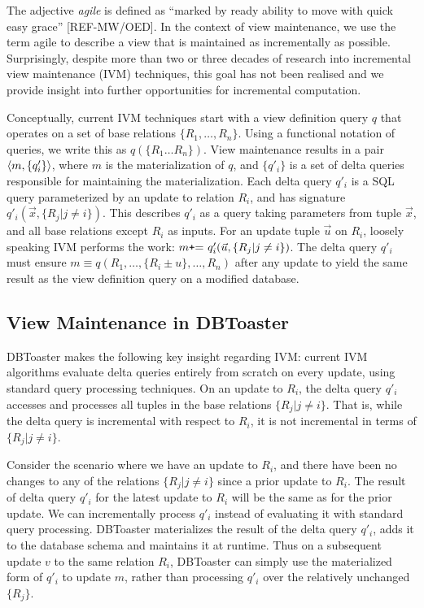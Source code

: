 \label{sec:compilation}

The adjective \textit{agile} is defined as ``marked by ready ability to move
with quick easy grace'' [REF-MW/OED]. In the context of view maintenance, we use
the term agile to describe a view that is maintained as incrementally as
possible. Surprisingly, despite more than two or three decades of research into
incremental view maintenance (IVM) techniques, this goal has not been realised
and we provide insight into further opportunities for incremental computation.

Conceptually, current IVM techniques
\cite{roussopoulos-tods:91,griffin-sigmod:95,zhou-icde:07,zhou-vldb:07} start
with a view definition query $q$ that operates on a set of base relations
$\{R_1, \ldots, R_n\}$. Using a functional notation of queries, we
write this as $q(\{R_1 \ldots R_n\})$. View maintenance results in a pair
${\langle m,\{q'_i\}\rangle}$, where $m$ is the materialization of $q$, and $\{q'_i\}$ is
a set of delta queries responsible for maintaining the materialization. Each
delta query $q'_i$ is a SQL query parameterized by an update to relation $R_i$,
and has signature $q'_i(\vec{x}, \{R_j | j \neq i\})$. This describes $q'_i$
as a query taking parameters from tuple $\vec{x}$, and all base relations
except $R_i$ as inputs. For an update tuple $\vec{u}$ on $R_i$, loosely speaking
IVM performs the work: $m \mbox{{\tt+}= } q'_i(\vec{u}, \{R_j | j \neq i\})$.
The delta query $q'_i$ must ensure
$m \equiv q(R_1, \ldots, \{R_i \pm {u}\}, \ldots, R_n)$ after any update to
yield the same result as the view definition query on a modified database.


\subsection{View Maintenance in DBToaster}
DBToaster makes the following key insight regarding IVM: current IVM algorithms
evaluate delta queries entirely from scratch on every update, using standard
query processing techniques. On an update to $R_i$, the delta query $q'_i$
accesses and processes all tuples in the base relations $\{R_j | j \neq i\}$.
That is, while the delta query is incremental with respect to $R_i$, it is not
incremental in terms of $\{R_j | j \neq i\}$.

Consider the scenario where we have an update to $R_i$, and there have been no
changes to any of the relations $\{R_j | j \neq i\}$ since a prior update to
$R_i$. The result of delta query $q'_i$ for the latest update to $R_i$ will be
the same as for the prior update. We can incrementally process $q'_i$ instead of
evaluating it with standard query processing.
DBToaster materializes the result of the delta query $q'_i$, adds it to the
database schema and maintains it at runtime. Thus on a subsequent update $v$ to
the same relation $R_i$, DBToaster can simply use the materialized form of
$q'_i$ to update $m$, rather than processing $q'_i$ over the
relatively unchanged $\{R_j\}$.

